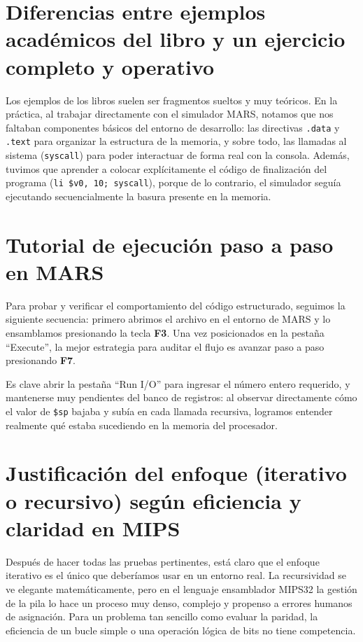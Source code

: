 \documentclass[12pt,letterpaper]{article}
\begin{document}
\section{Diferencias entre ejemplos académicos del libro y un ejercicio completo y operativo}
Los ejemplos de los libros suelen ser fragmentos sueltos y muy teóricos. En la práctica, al trabajar directamente con el simulador MARS, notamos que nos faltaban componentes básicos del entorno de desarrollo: las directivas \texttt{.data} y \texttt{.text} para organizar la estructura de la memoria, y sobre todo, las llamadas al sistema (\texttt{syscall}) para poder interactuar de forma real con la consola. Además, tuvimos que aprender a colocar explícitamente el código de finalización del programa (\texttt{li \$v0, 10; syscall}), porque de lo contrario, el simulador seguía ejecutando secuencialmente la basura presente en la memoria.

\section{Tutorial de ejecución paso a paso en MARS}
Para probar y verificar el comportamiento del código estructurado, seguimos la siguiente secuencia: primero abrimos el archivo en el entorno de MARS y lo ensamblamos presionando la tecla \textbf{F3}. Una vez posicionados en la pestaña ``Execute'', la mejor estrategia para auditar el flujo es avanzar paso a paso presionando \textbf{F7}. 

Es clave abrir la pestaña ``Run I/O'' para ingresar el número entero requerido, y mantenerse muy pendientes del banco de registros: al observar directamente cómo el valor de \texttt{\$sp} bajaba y subía en cada llamada recursiva, logramos entender realmente qué estaba sucediendo en la memoria del procesador.

\section{Justificación del enfoque (iterativo o recursivo) según eficiencia y claridad en MIPS}
Después de hacer todas las pruebas pertinentes, está claro que el enfoque iterativo es el único que deberíamos usar en un entorno real. La recursividad se ve elegante matemáticamente, pero en el lenguaje ensamblador MIPS32 la gestión de la pila lo hace un proceso muy denso, complejo y propenso a errores humanos de asignación. Para un problema tan sencillo como evaluar la paridad, la eficiencia de un bucle simple o una operación lógica de bits no tiene competencia. 
\end{document}

